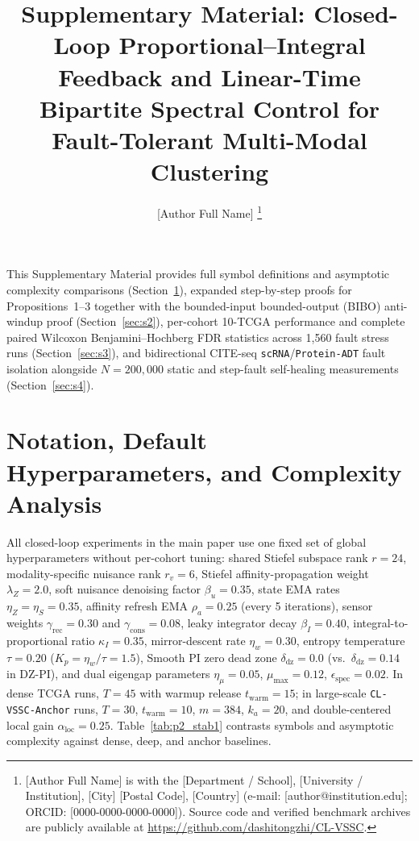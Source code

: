 \documentclass[journal]{IEEEtran}
\begin{document}
\title{Supplementary Material: Closed-Loop Proportional--Integral Feedback and Linear-Time Bipartite Spectral Control for Fault-Tolerant Multi-Modal Clustering}

\author{[Author Full Name]%
\thanks{[Author Full Name] is with the [Department / School], [University / Institution], [City] [Postal Code], [Country] (e-mail: [author@institution.edu]; ORCID: [0000-0000-0000-0000]). Source code and verified benchmark archives are publicly available at \url{https://github.com/dashitongzhi/CL-VSSC}.}}

\maketitle

\noindent This Supplementary Material provides full symbol definitions and asymptotic complexity comparisons (Section~\ref{sec:s1}), expanded step-by-step proofs for Propositions~1--3 together with the bounded-input bounded-output (BIBO) anti-windup proof (Section~\ref{sec:s2}), per-cohort 10-TCGA performance and complete paired Wilcoxon Benjamini--Hochberg FDR statistics across 1,560 fault stress runs (Section~\ref{sec:s3}), and bidirectional CITE-seq \texttt{scRNA}/\texttt{Protein-ADT} fault isolation alongside $N=200{,}000$ static and step-fault self-healing measurements (Section~\ref{sec:s4}).

\section{Notation, Default Hyperparameters, and Complexity Analysis}\label{sec:s1}

All closed-loop experiments in the main paper use one fixed set of global hyperparameters without per-cohort tuning: shared Stiefel subspace rank $r = 24$, modality-specific nuisance rank $r_v = 6$, Stiefel affinity-propagation weight $\lambda_Z = 2.0$, soft nuisance denoising factor $\beta_u = 0.35$, state EMA rates $\eta_Z = \eta_S = 0.35$, affinity refresh EMA $\rho_a = 0.25$ (every 5 iterations), sensor weights $\gamma_{\mathrm{rec}} = 0.30$ and $\gamma_{\mathrm{cons}} = 0.08$, leaky integrator decay $\beta_I = 0.40$, integral-to-proportional ratio $\kappa_I = 0.35$, mirror-descent rate $\eta_w = 0.30$, entropy temperature $\tau = 0.20$ ($K_p = \eta_w/\tau = 1.5$), Smooth PI zero dead zone $\delta_{\mathrm{dz}} = 0.0$ (vs.\ $\delta_{\mathrm{dz}} = 0.14$ in DZ-PI), and dual eigengap parameters $\eta_\mu = 0.05$, $\mu_{\max} = 0.12$, $\epsilon_{\mathrm{spec}} = 0.02$. In dense TCGA runs, $T = 45$ with warmup release $t_{\mathrm{warm}} = 15$; in large-scale \texttt{CL-VSSC-Anchor} runs, $T = 30$, $t_{\mathrm{warm}} = 10$, $m = 384$, $k_a = 20$, and double-centered local gain $\alpha_{\mathrm{loc}} = 0.25$. Table~\ref{tab:p2_stab1} contrasts symbols and asymptotic complexity against dense, deep, and anchor baselines.
\end{document}
